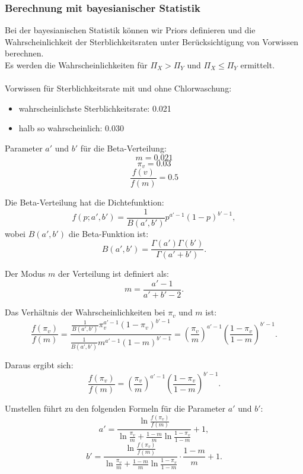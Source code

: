 \documentclass[a4paper,12pt]{article}
\begin{document}
\subsubsection{Berechnung mit bayesianischer Statistik}
Bei der bayesianischen Statistik können wir Priors definieren und die Wahrscheinlichkeit der 
Sterblichkeitsraten unter Berücksichtigung von Vorwissen berechnen. \\
Es werden die Wahrscheinlichkeiten für $\Pi_X > \Pi_Y$ und $\Pi_X \leq \Pi_Y$ ermittelt. \\\\
Vorwissen für Sterblichkeitsrate mit und ohne Chlorwaschung:
\begin{itemize}
    \item wahrscheinlichste Sterblichkeitsrate: 0.021
    \item halb so wahrscheinlich: 0.030
\end{itemize}

Parameter $a'$ und $b'$ für die Beta-Verteilung:\\
\begin{equation}
  m = 0.021
\end{equation}
\begin{equation}
  \pi_v = 0.03
\end{equation}
\begin{equation}
  \frac{f(v)}{f(m)} = 0.5
\end{equation}

Die Beta-Verteilung hat die Dichtefunktion:
\[
f(p; a', b') = \frac{1}{B(a', b')} p^{a'-1} (1-p)^{b'-1},
\]
wobei \( B(a', b') \) die Beta-Funktion ist:
\[
B(a', b') = \frac{\Gamma(a') \Gamma(b')}{\Gamma(a' + b')}.
\]

Der Modus \( m \) der Verteilung ist definiert als:
\[
m = \frac{a'-1}{a' + b' - 2}.
\]

Das Verhältnis der Wahrscheinlichkeiten bei \( \pi_v \) und \( m \) ist:
\[
\frac{f(\pi_v)}{f(m)} = \frac{\frac{1}{B(a', b')} \pi_v^{a'-1} (1-\pi_v)^{b'-1}}{\frac{1}{B(a', b')} m^{a'-1} (1-m)^{b'-1}} = \left( \frac{\pi_v}{m} \right)^{a'-1} \left( \frac{1-\pi_v}{1-m} \right)^{b'-1}.
\]

Daraus ergibt sich:
\[
\frac{f(\pi_v)}{f(m)} = \left( \frac{\pi_v}{m} \right)^{a'-1} \left( \frac{1-\pi_v}{1-m} \right)^{b'-1}.
\]

Umstellen führt zu den folgenden Formeln für die Parameter \( a' \) und \( b' \):
\[
a' = \frac{\ln \frac{f(\pi_v)}{f(m)}}{\ln \frac{\pi_v}{m} + \frac{1-m}{m} \ln \frac{1-\pi_v}{1-m}} + 1,
\]
\[
b' = \frac{\ln \frac{f(\pi_v)}{f(m)}}{\ln \frac{\pi_v}{m} + \frac{1-m}{m} \ln \frac{1-\pi_v}{1-m}} \cdot \frac{1-m}{m} + 1.
\]
\end{document}
